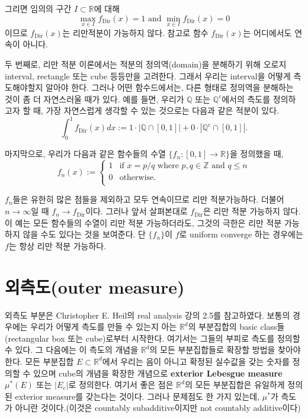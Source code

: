 \documentclass[b5paper,]{scrbook}
\theoremstyle{plain}
\theoremstyle{definition}
\numberwithin{equation}{section}
\begin{document}
그리면 임의의 구간 \(I\subset\mathbb{R}\)에 대해
\[\max_{x\in I}f_{\text{Dir}}(x) =1 \text{ and } \min_{x\in I}f_{\text{Dir}}(x) =0\]
이므로 \(f_{\text{Dir}}(x)\)는 리만적분이 가능하지 않다. 참고로 함수 \(f_{\text{Dir}}(x)\)는 어디에서도 연속이 아니다.

두 번째로, 리만 적분 이론에서는 적분의 정의역(domain)을 분해하기 위해 오로지 interval, rectangle 또는 cube 등등만을 고려한다. 그래서 우리는 interval을 어떻게 측도해야할지 알아야 한다. 그러나 어떤 함수드에서는, 다른 형태로 정의역을 분해하는 것이 좀 더 자연스러울 때가 있다. 예를 들면, 우리가 \(\mathbb{Q}\) 또는 \(\mathbb{Q}^{c}\)에서의 측도를 정의하고자 할 때, 가장 자연스럽게 생각할 수 있는 것으로는 다음과 같은 적분이 있다.
\[\int_{0}^{1}f_{\text{Dir}}(x)dx:=1\cdot |\mathbb{Q}\cap [0,1]| + 0\cdot |\mathbb{Q}^{c}\cap [0,1]|.\]

마지막으로, 우리가 다음과 같은 함수들의 수열 \(\{f_{n}:[0,1]\rightarrow\mathbb{R} \}\)을 정의했을 때,
\[
f_{n}(x) := 
\begin{cases}
1 & \text{if $x=p/q$ where $p,q\in\mathbb{Z}$ and $q\leq n$} \\
0 & \text{otherwise.}\\
\end{cases}
\]

\(f_{n}\)들은 유한히 많은 점들을 제외하고 모두 연속이므로 리만 적분가능하다. 더불어 \(n\rightarrow \infty\)일 때 \(f_{n}\rightarrow f_{\text{Dir}}\)이다. 그러나 앞서 살펴본대로 \(f_{\text{Dir}}\)은 리만 적분 가능하지 않다. 이 예는 모든 함수들의 수열이 리만 적분 가능하더라도, 그것의 극한은 리만 적분 가능하지 않을 수도 있다는 것을 보여준다. 단 \(\{f_{n}\}\)이 \(f\)로 uniform converge 하는 경우에는 \(f\)는 항상 리만 적분 가능하다.

\hypertarget{outer-measure}{%
\section{외측도(outer measure)}\label{outer-measure}}

외측도 부분은 Christopher E. Heil의 real analysis 강의 2.5를 참고하였다. 보통의 경우에는 우리가 어떻게 측도를 만들 수 있는지 아는 \(\mathbb{R}^{d}\)의 부분집합의 basic class들(rectangular box 또는 cube)로부터 시작한다. 여기서는 그들의 부피로 측도를 정의할 수 있다. 그 다음에는 이 측도의 개념을 \(\mathbb{R}^{d}\)의 모든 부분집합들로 확장할 방법을 찾아야 한다. 모든 부분집합 \(E \subset \mathbb{R}^{d}\)에서 우리는 음이 아니고 확정된 실수값을 갖는 숫자를 정의할 수 있으며 cube의 개념을 확장한 개념으로 \textbf{exterior Lebesgue measure} \(\mu^{*}(E)\) 또는 \(|E_{e}|\)로 정의한다. 여기서 좋은 점은 \(\mathbb{R}^{d}\)의 모든 부분집합은 유일하게 정의된 exterior measure를 갖는다는 것이다. 그러나 문제점도 한 가지 있는데, \(\mu^{*}\)가 측도가 아니란 것이다.(이것은 countably subadditive이지만 not countably additive이다)
\end{document}
